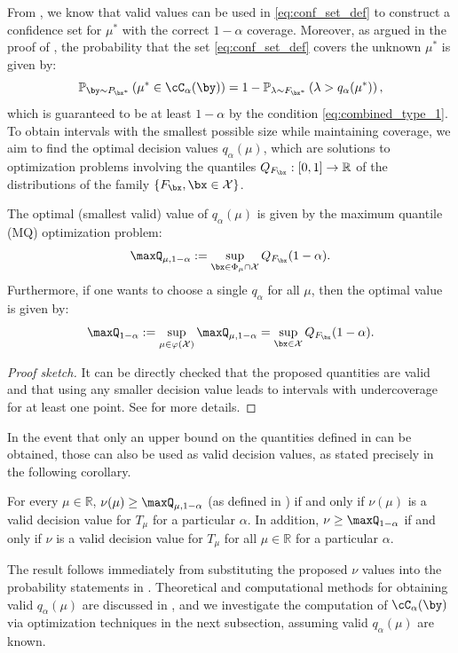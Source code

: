 \documentclass[11pt]{article}
\numberwithin{equation}{section}
\numberwithin{figure}{section}
\begin{document}
From , we know that valid values can be used in \eqref{eq:conf_set_def} to construct a confidence set for $\mu^*$ with the correct $1-\alpha$ coverage. 
Moreover, as argued in the proof of , the probability that the set \eqref{eq:conf_set_def} covers the unknown $\mu^*$ is given by:
\begin{equation}\label{eq:exactprobability}
    \mathbb{P}_{\by \sim P_{\bx^*}} \left( \mu^* \in \cC_\alpha(\by) \right) = 1-\mathbb{P}_{\lambda \sim F_{\bx^*}} \left(\lambda > q_\alpha(\mu^*) \right),
\end{equation}
which is guaranteed to be at least $1-\alpha$ by the condition \eqref{eq:combined_type_1}. 
To obtain intervals with the smallest possible size while maintaining coverage, we aim to find the optimal decision values $q_\alpha(\mu)$, which are solutions to optimization problems involving the quantiles $Q_{F_{\bx}}: [0,1] \to \mathbb{R}$ of the distributions of the family $\{F_{\bx}, \bx \in \mathcal{X}\}$.
\begin{lemma}\label{lemma:quantile}
    The optimal (smallest valid) value of $q_\alpha(\mu)$ is given by the maximum quantile (MQ) optimization problem:
    \begin{equation} \label{eq:QuantileOpt1}
    \maxQ_{\mu, 1-\alpha} := \sup_{\bx \in  \Phi_\mu \cap \mathcal{X}} Q_{F_\bx}(1-\alpha).
    \end{equation}
    Furthermore, if one wants to choose a single $q_\alpha$ for all $\mu$, then the optimal value is given by:
    \begin{equation} \label{eq:QuantileOpt2}
        \maxQ_{1-\alpha} := \sup_{\mu \in \varphi(\mathcal{X})} \maxQ_{\mu, 1-\alpha} = \sup_{\bx \in \mathcal{X}}  Q_{F_\bx}(1-\alpha).
    \end{equation}
\end{lemma}
\begin{proof}[Proof sketch] 
It can be directly checked that the proposed quantities are valid and that using any smaller decision value leads to intervals with undercoverage for at least one point. See  for more details.
\end{proof}
In the event that only an upper bound on the quantities defined in  can be obtained, those can also be used as valid decision values, as stated precisely in the following corollary.
\begin{corollary}
    For every $\mu \in \mathbb{R}$, $\nu(\mu) \geq \maxQ_{\mu, 1-\alpha}$ (as defined in )  if and only if $\nu(\mu)$ is a valid decision value for $T_\mu$ for a particular $\alpha$.
    In addition, $\nu \geq \maxQ_{1-\alpha}$ if and only if $\nu$ is a valid decision value for $T_\mu$ for all $\mu \in \mathbb{R}$ for a particular $\alpha$.
\end{corollary}
    The result follows immediately from substituting the proposed $\nu$ values into the probability statements in .
Theoretical and computational methods for obtaining valid $q_\alpha(\mu)$ are discussed in , and we investigate the computation of $\cC_\alpha(\by)$ via optimization techniques in the next subsection, assuming valid $q_\alpha(\mu)$ are known. 
\end{document}
